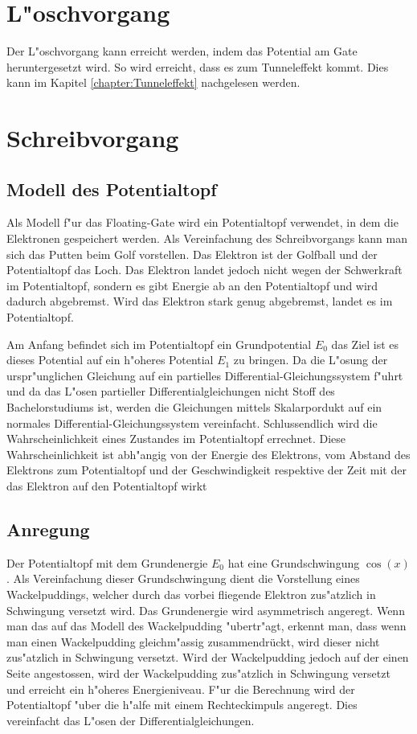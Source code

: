 \begin{refsection}
\section{L"oschvorgang}
Der L"oschvorgang kann erreicht werden, indem das Potential am Gate
heruntergesetzt wird. So wird erreicht, dass es zum Tunneleffekt
kommt. Dies kann im Kapitel \ref{chapter:Tunneleffekt} nachgelesen werden.


\section{Schreibvorgang}

\subsection{Modell des Potentialtopf}
Als Modell f"ur das Floating-Gate wird ein Potentialtopf verwendet,
in dem die Elektronen gespeichert werden.
Als Vereinfachung des Schreibvorgangs kann man sich das Putten beim
Golf vorstellen. Das Elektron ist der Golfball und der Potentialtopf
das Loch. Das Elektron landet jedoch nicht wegen der Schwerkraft im
Potentialtopf, sondern es gibt Energie ab an den Potentialtopf und wird
dadurch abgebremst. Wird das Elektron stark genug abgebremst, landet es
im Potentialtopf.

Am Anfang befindet sich im Potentialtopf ein Grundpotential $E_{0}$
das Ziel ist es dieses Potential auf ein h"oheres Potential $E_{1}$
zu bringen. Da die L"osung der urspr"unglichen Gleichung auf ein
partielles Differential-Gleichungssystem f"uhrt und da das L"osen
partieller Differentialgleichungen nicht Stoff des Bachelorstudiums
ist, werden die Gleichungen mittels Skalarpordukt auf ein normales
Differential-Gleichungssystem vereinfacht. Schlussendlich wird die
Wahrscheinlichkeit eines Zustandes im Potentialtopf errechnet. Diese
Wahrscheinlichkeit ist abh"angig von der Energie des Elektrons, vom
Abstand des Elektrons zum Potentialtopf und der Geschwindigkeit respektive
der Zeit mit der das Elektron auf den Potentialtopf wirkt

\subsection{Anregung}
Der Potentialtopf mit dem Grundenergie $E_{0}$ hat eine Grundschwingung
$\cos(x)$.  Als Vereinfachung dieser Grundschwingung dient die
Vorstellung eines Wackelpuddings, welcher durch das vorbei fliegende
Elektron zus"atzlich in Schwingung versetzt wird.  Das Grundenergie
wird asymmetrisch angeregt. Wenn man das auf das Modell des
Wackelpudding "ubertr"agt, erkennt man, dass wenn man einen Wackelpudding
gleichm"assig zusammendrückt, wird dieser nicht zus"atzlich in Schwingung
versetzt. Wird der Wackelpudding jedoch auf der einen Seite angestossen,
wird der Wackelpudding zus"atzlich in Schwingung versetzt und erreicht
ein h"oheres Energieniveau.  F"ur die Berechnung wird der Potentialtopf
"uber die h"alfe mit einem Rechteckimpuls angeregt. Dies vereinfacht
das L"osen der Differentialgleichungen.


\end{refsection}
